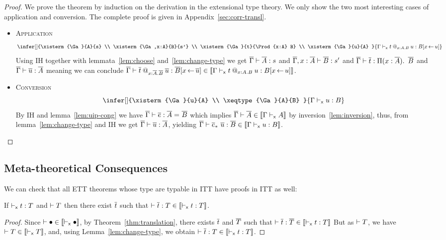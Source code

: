 \begin{proof}
  We prove the theorem by induction on the derivation in the
  extensional type theory. We only show the two most interesting cases
  of application and conversion.
  The complete proof is given in Appendix~\ref{sec:corr-transl}.

  \begin{itemize}
    \item \textsc{Application}
    \[
      \infer[]
        {\xisterm{\Ga}{A}{s} \\
         \xisterm{\Ga,x:A}{B}{s'} \\
         \xisterm{\Ga}{t}{\Prod{x:A} B} \\
         \xisterm{\Ga}{u}{A}
        }
        {\xisterm{\Ga}{\app{t}{x:A}{B}{u}}{B[x \sto u]}}
    \]
    Using IH together with lemmata~\ref{lem:choose} and~\ref{lem:change-type}
    we get $\overline{\Gamma} \vdash \overline{A} : s$ and $\overline{\Gamma},x:\overline{A} \vdash \overline{B} : s'$ and
    $\overline{\Gamma} \vdash \overline{t} : \mathop{\Pi(x:\overline{A}).\ } \overline{B}$ and $\overline{\Gamma} \vdash \overline{u} : \overline{A}$
    meaning we can conclude
    $\overline{\Gamma} \vdash \overline{t}\mathbin{@_{x:\overline{A}.\overline{B}}} \overline{u} : \overline{B}[x \mathop{\leftarrow} \overline{u}]
    \in \llbracket \Gamma \vdash_{\mathsf{x}} t\mathbin{@_{x:A.B}} u : B[x \mathop{\leftarrow} u] \rrbracket$.

    \item \textsc{Conversion}
    \[
      \infer[]
        {\xisterm{\Ga}{u}{A} \\
         \xeqtype{\Ga}{A}{B}
        }
        {\xisterm{\Ga}{u}{B}}
    \]
    By IH and lemma~\ref{lem:uip-cong} we have
    $\overline{\Gamma} \vdash \overline{e} : \overline{A} =_{} \overline{B}$ which implies
    $\overline{\Gamma} \vdash \overline{A} \in \llbracket \Gamma \vdash_{\mathsf{x}} A \rrbracket$ by
    inversion~\eqref{lem:inversion}, thus, from lemma~\ref{lem:change-type}
    and IH we get $\overline{\Gamma} \vdash \overline{u} : \overline{A}$, yielding
    $\overline{\Gamma} \vdash \overline{e}_*\ \overline{u} : \overline{B} \in \llbracket \Gamma \vdash_{\mathsf{x}} u : B \rrbracket$.
  \end{itemize}

\end{proof}


\subsection{Meta-theoretical Consequences}
\label{sec:meta-consequences}

We can check that all ETT theorems whose type are typable in ITT have
proofs in ITT as well:

\begin{corollary}
  \label{cor:preservation}
  If $\vdash_{\mathsf{x}} t : T$ and $\vdash T$ then there exist $\overline{t}$ such that
    $\vdash \overline{t} : T \in \llbracket \vdash_{\mathsf{x}} t : T \rrbracket$.
\end{corollary}
\begin{proof}
  Since $\vdash \bullet \in \llbracket \vdash_{\mathsf{x}} \bullet \rrbracket$, by
  Theorem~\eqref{thm:translation}, there exists $\overline{t}$ and $\overline{T}$ such
  that
  $\vdash \overline{t} : \overline{T} \in \llbracket \vdash_{\mathsf{x}} t : T \rrbracket$
  But as $\vdash T$, we have
  $\vdash T \in \llbracket \vdash_{\mathsf{x}} T \rrbracket$, and,
  using Lemma~\ref{lem:change-type}, we obtain
  $\vdash \overline{t} : T \in \llbracket \vdash_{\mathsf{x}} t : T \rrbracket$.
\end{proof}

